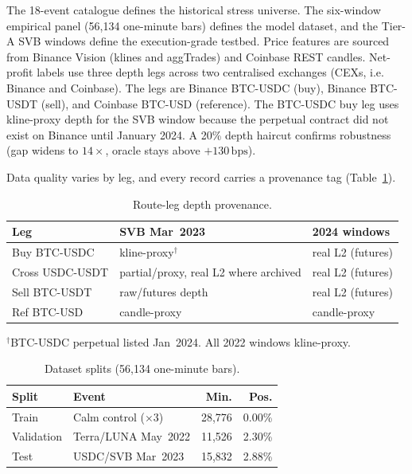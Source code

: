 \documentclass[sigconf,anonymous,natbib=false]{acmart}
\newcommand{\bps}{\,\text{bps}}
\begin{document}
The 18-event catalogue defines the historical stress universe. The
six-window empirical panel (56,134 one-minute bars) defines the model
dataset, and the Tier-A SVB windows define the execution-grade testbed.
Price features are sourced from Binance Vision (klines and aggTrades)
and Coinbase REST candles.
Net-profit labels use three depth legs across two centralised
exchanges (CEXs, i.e. Binance and Coinbase). The legs are Binance BTC-USDC (buy),
Binance BTC-USDT (sell), and Coinbase BTC-USD (reference).
The BTC-USDC buy leg uses kline-proxy depth for the SVB window because
the perpetual contract did not exist on Binance until January 2024.
A 20\% depth haircut confirms robustness (gap widens to $14\times$,
oracle stays above $+130\bps$).

Data quality varies by leg, and every record carries a provenance tag
(Table~\ref{tab:route_provenance}).

\begin{table}[t]
\centering
\caption{Route-leg depth provenance.}
\label{tab:route_provenance}
\setlength{\tabcolsep}{2pt}
{\scriptsize
\begin{tabular}{lp{2.1cm}p{2.1cm}}
\toprule
\textbf{Leg} & \textbf{SVB Mar~2023} & \textbf{2024 windows}\\
\midrule
Buy BTC-USDC    & kline-proxy$^\dagger$  & real L2 (futures)\\
Cross USDC-USDT & partial/proxy, real L2 where archived  & real L2 (futures)\\
Sell BTC-USDT   & raw/futures depth     & real L2 (futures)\\
Ref BTC-USD     & candle-proxy          & candle-proxy\\
\bottomrule
\end{tabular}
}
{\footnotesize $^\dagger$BTC-USDC perpetual listed Jan~2024.
All 2022 windows kline-proxy.}
\end{table}

\begin{table}[t]
\centering
\caption{Dataset splits (56,134 one-minute bars).}
\label{tab:dataset}
\setlength{\tabcolsep}{4pt}
{\small
\begin{tabular}{llrr}
\toprule
\textbf{Split} & \textbf{Event} & \textbf{Min.} & \textbf{Pos.}\\
\midrule
Train      & Calm control ($\times$3) & 28,776 & 0.00\%\\
Validation & Terra/LUNA May~2022      & 11,526 & 2.30\%\\
Test       & USDC/SVB Mar~2023        & 15,832 & 2.88\%\\
\bottomrule
\end{tabular}
}
\end{table}
\end{document}
